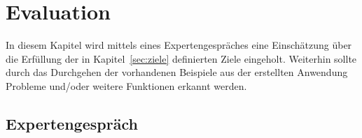 \chapter{Evaluation}\label{ch:evaluation}
In diesem Kapitel wird mittels eines Expertengespräches eine Einschätzung über die Erfüllung der in
Kapitel~\ref{sec:ziele} definierten Ziele eingeholt.
Weiterhin sollte durch das Durchgehen der vorhandenen Beispiele aus der erstellten Anwendung Probleme und/oder weitere
Funktionen erkannt werden.

\section{Expertengespräch}\label{sec:expertengespraech}



